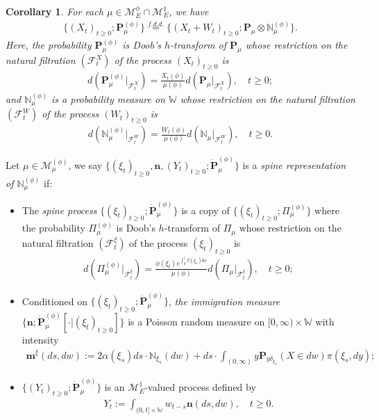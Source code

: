\documentclass[UTF8]{pkuthss}
\theoremstyle{plain}
\newtheorem{cor}[thm]{Corollary}
\theoremstyle{definition}
\numberwithin{equation}{section}
\begin{document}
\begin{cor}
	For each $\mu \in \mathcal M_E^\phi \cap \mathcal M_E^1$, we have
\begin{align}
	\{(X_t)_{t\geq 0}; \mathbf P_\mu^{(\phi)}\}
	\overset{f.d.d.}{=} \{(X_t + W_t)_{t\geq 0}; \mathbf P_\mu \otimes \mathbb N^{(\phi)}_\mu\}.
\end{align}
	Here, the probability $\mathbf P_\mu^{(\phi)}$ is Doob's $h$-transform of $\mathbf P_\mu$ whose restriction on the natural filtration $(\mathscr F_t^X)$ of the process $(X_t)_{t\geq 0}$ is
\begin{align}
	d ( \mathbf P_\mu^{(\phi)}|_{\mathscr F_t^X})
	= \frac{X_t(\phi)}{ \mu(\phi)} d(\mathbf P_\mu|_{\mathscr F_t^X}),
	\quad t\geq 0;
\end{align}
	and $\mathbb N_\mu^{(\phi)}$ is a probability measure on $\mathbb W$ whose restriction on the natural filtration $(\mathscr F_t^W)$ of the process $(W_t)_{t\geq 0}$ is
\begin{align}
	d(\mathbb N_\mu^{(\phi)} |_{\mathscr F^W_t}  )
	= \frac{W_t(\phi)}{\mu(\phi)} d(\mathbb N_\mu |_{\mathscr F^W_t}  ),
	\quad t\geq 0.
\end{align}
\end{cor}

	Let $\mu \in \mathcal M^{(\phi)}_\mu$, we say $\{(\xi_t)_{t\geq 0}, \mathbf n, (Y_t)_{ t\geq 0}; \dot {\mathbf P}^{(\phi)}_\mu\}$ is a \emph{spine representation of $\mathbb N^{(\phi)}_\mu$} if:
\begin{itemize}
\item
	The \emph{spine process} $\{(\xi_t)_{t\geq 0}; \dot{\mathbf P}^{(\phi)}_\mu\}$ is a copy of $\{(\xi_t)_{t\geq 0}; \Pi^{(\phi)}_{\mu}\}$ where the probability $\Pi_{\mu}^{(\phi)}$ is Doob's $h$-transform of $\Pi_\mu$ whose restriction on the natural filtration $(\mathscr F_t^\xi)$ of the process $(\xi_t)_{t\geq 0}$ is
\begin{align}
	d(\Pi_{\mu}^{(\phi)} |_{\mathscr F_t^\xi})
	= \frac{\phi(\xi_t)e^{\int_0^t \beta(\xi_s)ds}}{\mu(\phi)} d(\Pi_{\mu} |_{\mathscr F_t^\xi}),
	\quad t\geq 0;
\end{align}
\item
	Conditioned on $\{(\xi_t)_{t\geq 0}; \dot{\mathbf P}^{(\phi)}_\mu\}$, \emph{the immigration measure} $\{\mathbf n; \dot{\mathbf P}^{(\phi)}_\mu[\cdot |(\xi_t)_{t\geq 0}]\}$ is a Poisson random measure on $[0,\infty ) \times \mathbb W$ with
    intensity
\begin{align}
	\mathbf m^\xi(ds,dw)
	:= 2 \alpha(\xi_s) ds \cdot \mathbb N_{\xi_s}(dw) + ds \cdot \int_{(0,\infty)} y \mathbf P_{y\delta_{\xi_s}}(X\in dw) \pi(\xi_s,dy);
\end{align}
\item
	$\{(Y_t)_{t\geq 0}; \dot{\mathbf P}^{(\phi)}_\mu\}$ is an $\mathcal M^1_E$-valued process defined by
\begin{align}
	Y_t
	:= \int_{(0,t] \times \mathbb W} w_{t-s} \mathbf n(ds,dw),
	\quad t\geq 0.
\end{align}
\end{itemize}
\end{document}
